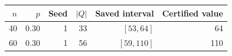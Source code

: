 \begin{tabular}{rrrrrr}
\toprule
$n$ & $p$ & Seed & $|Q|$ & Saved interval & Certified value\\
\midrule
40 & 0.30 & 1 & 33 & $[53,64]$ & 64\\
60 & 0.30 & 1 & 56 & $[59,110]$ & 110\\
\bottomrule
\end{tabular}
